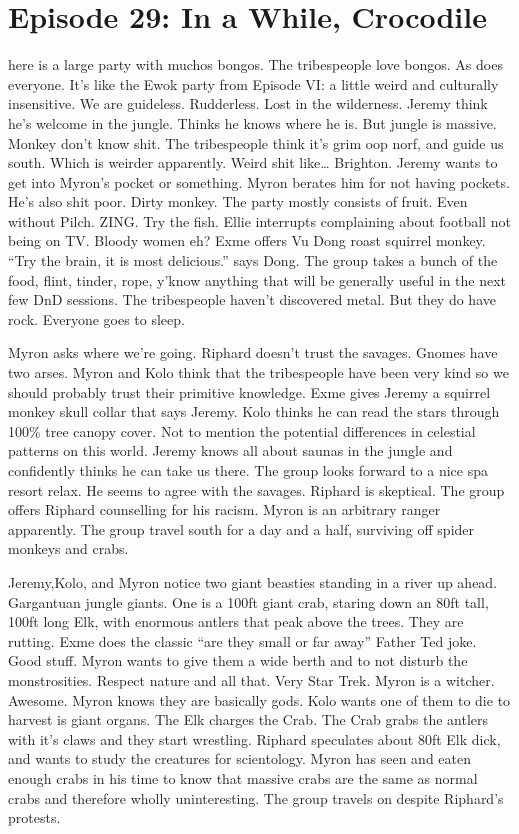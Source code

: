 \section{Episode 29: In a While, Crocodile}

\medskip

here is a large party with muchos bongos. The tribespeople love bongos. As does everyone. It’s like the Ewok party from Episode VI: a little weird and culturally insensitive. We are guideless. Rudderless. Lost in the wilderness. 
Jeremy think he’s welcome in the jungle. Thinks he knows where he is. But jungle is massive. Monkey don’t know shit. 
The tribespeople think it’s grim oop norf, and guide us south. Which is weirder apparently. Weird shit like… Brighton. Jeremy wants to get into Myron’s pocket or something. Myron berates him for not having pockets. He’s also shit poor. Dirty monkey. The party mostly consists of fruit. Even without Pilch. ZING. Try the fish. Ellie interrupts complaining about football not being on TV. Bloody women eh? Exme offers Vu Dong roast squirrel monkey. “Try the brain, it is most delicious.” says Dong. The group takes a bunch of the food, flint, tinder, rope, y’know anything that will be generally useful in the next few DnD sessions. The tribespeople haven’t discovered metal. But they do have rock. Everyone goes to sleep.\medskip

Myron asks where we’re going. Riphard doesn’t trust the savages. Gnomes have two arses. Myron and Kolo think that the tribespeople have been very kind so we should probably trust their primitive knowledge. Exme gives Jeremy a squirrel monkey skull collar that says Jeremy. Kolo thinks he can read the stars through 100\% tree canopy cover. Not to mention the potential differences in celestial patterns on this world. Jeremy knows all about saunas in the jungle and confidently thinks he can take us there. The group looks forward to a nice spa resort relax. He seems to agree with the savages. Riphard is skeptical. The group offers Riphard counselling for his racism. Myron is an arbitrary ranger apparently. The group travel south for a day and a half, surviving off spider monkeys and crabs.\medskip

Jeremy,Kolo, and Myron notice two giant beasties standing in a river up ahead. Gargantuan jungle giants. One is a 100ft giant crab, staring down an 80ft tall, 100ft long Elk, with enormous antlers that peak above the trees. They are rutting. Exme does the classic “are they small or far away” Father Ted joke. Good stuff. Myron wants to give them a wide berth and to not disturb the monstrosities. Respect nature and all that. Very Star Trek. Myron is a witcher. Awesome. Myron knows they are basically gods. Kolo wants one of them to die to harvest is giant organs. The Elk charges the Crab. The Crab grabs the antlers with it’s claws and they start wrestling. Riphard speculates about 80ft Elk dick, and wants to study the creatures for scientology. Myron has seen and eaten enough crabs in his time to know that massive crabs are the same as normal crabs and therefore wholly uninteresting. The group travels on despite Riphard’s protests.\medskip

